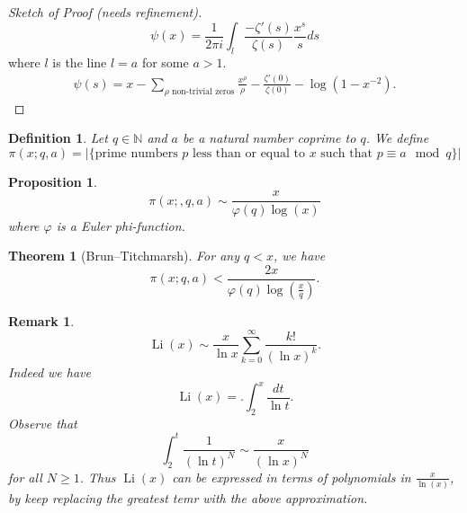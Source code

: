 \documentclass{article}
\newtheorem{theorem}{Theorem} [section]
\newtheorem{proposition}{Proposition}[section]
\newtheorem{definition}{Definition}[section]
\newtheorem{remark}{Remark}[section]
\DeclareMathOperator{\Li}{Li}
\newcommand{\N}[0]{\mathbb{N}}
\begin{document}
\begin{proof}[Sketch of Proof (needs refinement)]
\begin{equation*}
\psi(x) = {\frac 1 {2\pi i}}\int_l{\frac {-\zeta'(s)} {\zeta(s)}}{\frac {x^s} s}ds
\end{equation*}
where $l$ is the line $l=a$ for some $a>1$.
\begin{align*}
\psi(s) = x - \sum_{\rho\text{ non-trivial zeros}} {\frac {x^\rho} \rho} - {\frac {\zeta'(0)} {\zeta(0)}} - \log(1-x^{-2}).
\end{align*}
\end{proof}

\begin{definition}
Let $q\in\N$ and $a$ be a natural number coprime to $q$. We define
\begin{equation*}
\pi(x;q,a) = \vert \{\text{prime numbers $p$ less than or equal to $x$ such that $p\equiv a\mod{q}$}\}\vert
\end{equation*}
\end{definition}
\begin{proposition}
\begin{equation*}
\pi(x;,q,a) \sim{\frac {x} {\varphi(q)\log(x)}}
\end{equation*}
where $\varphi$ is a Euler phi-function.
\end{proposition}

\begin{theorem}[Brun–Titchmarsh]
For any $q<x$, we have
\begin{equation*}
\pi(x;q,a) <{\frac {2x} {\varphi(q)\log({\frac x q})}}.
\end{equation*}
\end{theorem}


\begin{remark}
  \begin{equation*}
    \Li(x)\sim{\frac x {\ln x}}\sum_{k=0}^\infty {\frac {k!} {(\ln x)^k}}.
  \end{equation*}
  Indeed we have 
  \begin{equation*}
    \Li(x) =. \int_2^x{\frac {dt} {\ln t}}.
  \end{equation*}
  Observe that 
  \begin{equation*}
    \int_2^t{\frac 1 {(\ln t)^N}} \sim {\frac x {(\ln x)^N}}
  \end{equation*}
  for all $N\geq 1$. Thus $\Li(x)$ can be expressed in terms of polynomials in ${\frac x {\ln (x)}}$, by keep replacing the greatest temr with the above approximation.
\end{remark}
\end{document}
